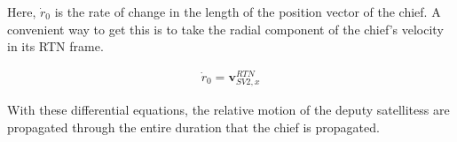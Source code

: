Here, $\dot{r}_0$ is the rate of change in the length of the position vector of the chief. A convenient way to get this is to take the radial component of the chief's velocity in its RTN frame.

\begin{align*}
    \dot{r}_0 = \boldsymbol{v}^{RTN}_{SV2, x}
\end{align*}

With these differential equations, the relative motion of the deputy satellitess are propagated through the entire duration that the chief is propagated.

\be

\subsubsection{}


\subsubsection{}

